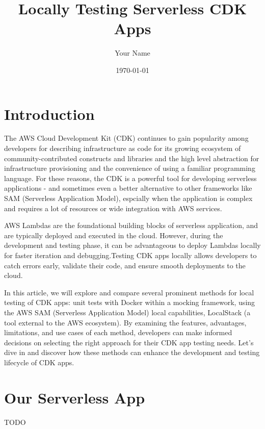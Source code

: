 \documentclass{article}
\title{Locally Testing Serverless CDK Apps}
\author{Your Name}
\date{\today}
\begin{document}
\maketitle

\begin{abstract}
\end{abstract}

\section{Introduction}

The AWS Cloud Development Kit (CDK) continues to gain popularity among developers for describing infrastructure as code for its growing ecosystem of community-contributed constructs and libraries and the high level abstraction for infrastructure provisioning and the convenience of using a familiar programming language. For these reasons, the CDK is a powerful tool for developing serverless applications - and sometimes even a better alternative to other frameworks like SAM (Serverless Application Model), espcially when the application is complex and requires a lot of resources or wide integration with AWS services.

AWS Lambdas are the foundational building blocks of serverless application, and are typically deployed and executed in the cloud. However, during the development and testing phase, it can be advantageous to deploy Lambdas locally for faster iteration and debugging.Testing CDK apps locally allows developers to catch errors early, validate their code, and ensure smooth deployments to the cloud.

In this article, we will explore and compare several prominent methods for local testing of CDK apps: unit tests with Docker within a mocking framework, using the AWS SAM (Serverless Application Model) local capabilities, LocalStack (a tool external to the AWS ecosystem). By examining the features, advantages, limitations, and use cases of each method, developers can make informed decisions on selecting the right approach for their CDK app testing needs. Let's dive in and discover how these methods can enhance the development and testing lifecycle of CDK apps.

\section{Our Serverless App}

TODO
\end{document}
